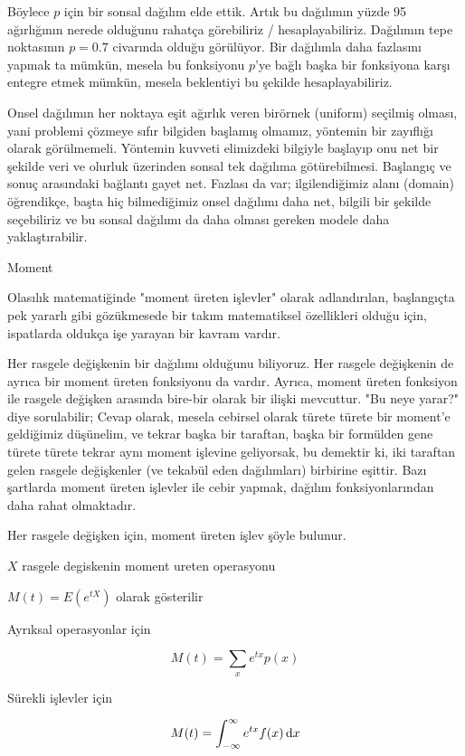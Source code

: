 \documentclass[12pt,fleqn]{article}\usepackage{../../common}
\begin{document}
Böylece $p$ için bir sonsal dağılım elde ettik. Artık bu dağılımın yüzde 95
ağırlığının nerede olduğunu rahatça görebiliriz /
hesaplayabiliriz. Dağılımın tepe noktasının $p=0.7$ civarında olduğu
görülüyor. Bir dağılımla daha fazlasını yapmak ta mümkün, mesela bu
fonksiyonu $p$'ye bağlı başka bir fonksiyona karşı entegre etmek mümkün,
mesela beklentiyi bu şekilde hesaplayabiliriz.

Onsel dağılımın her noktaya eşit ağırlık veren birörnek (uniform) seçilmiş
olması, yani problemi çözmeye sıfır bilgiden başlamış olmamız, yöntemin bir
zayıflığı olarak görülmemeli. Yöntemin kuvveti elimizdeki bilgiyle başlayıp
onu net bir şekilde veri ve olurluk üzerinden sonsal tek dağılıma
götürebilmesi. Başlangıç ve sonuç arasındaki bağlantı gayet net. Fazlası da
var; ilgilendiğimiz alanı (domain) öğrendikçe, başta hiç bilmediğimiz onsel
dağılımı daha net, bilgili bir şekilde seçebiliriz ve bu sonsal dağılımı da
daha olması gereken modele daha yaklaştırabilir. 

\newpage

Moment 

Olasılık matematiğinde "moment üreten işlevler" olarak adlandırılan,
başlangıçta pek yararlı gibi gözükmesede bir takım matematiksel
özellikleri olduğu için, ispatlarda oldukça işe yarayan bir kavram
vardır.

Her rasgele değişkenin bir dağılımı olduğunu biliyoruz. Her rasgele
değişkenin de ayrıca bir moment üreten fonksiyonu da vardır. Ayrıca,
moment üreten fonksiyon ile rasgele değişken arasında bire-bir olarak
bir ilişki mevcuttur. "Bu neye yarar?" diye sorulabilir; Cevap olarak,
mesela cebirsel olarak türete türete bir moment'e geldiğimiz
düşünelim, ve tekrar başka bir taraftan, başka bir formülden gene
türete türete tekrar aynı moment işlevine geliyorsak, bu demektir ki,
iki taraftan gelen rasgele değişkenler (ve tekabül eden dağılımları)
birbirine eşittir. Bazı şartlarda moment üreten işlevler ile cebir
yapmak, dağılım fonksiyonlarından daha rahat olmaktadır.

Her rasgele değişken için, moment üreten işlev şöyle bulunur.

$X$ rasgele degiskenin moment ureten operasyonu

$M(t)=E(e^{tX})$ olarak gösterilir

Ayrıksal operasyonlar için

$$ M(t) = \sum_x e^{tx}p(x) $$

Sürekli işlevler için

$$ M(t) = \int_{-\infty}^{\infty} e^{tx}f(x) \,\mathrm{d} x   $$
\end{document}
